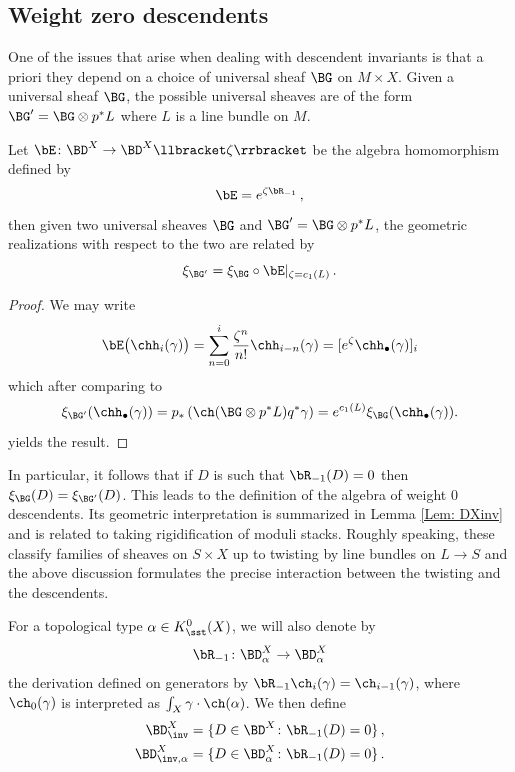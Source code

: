 \subsection{Weight zero descendents}
\label{sec: invariantdescendents}



One of the issues that arise when dealing with descendent invariants is that a priori they depend on a choice of universal sheaf $\BG$ on $M\times X$. Given a universal sheaf $\BG$, the possible universal sheaves are of the form
$\BG'=\BG\otimes p^\ast L$ where $L$ is a line bundle on $M$.
\begin{lemma}
\notready
\label{lem: changeuniversalsheaf}
Let $\bE\colon \BD^X\to \BD^X\llbracket\zeta\rrbracket$ be the algebra homomorphism defined by
$$
\bE = e^{\zeta \bR_{-1}}\,,
$$
then given two universal sheaves $\BG$ and $\BG'=\BG\otimes p^\ast L$, the geometric realizations with respect to the two are related by
\[\xi_{\BG'}=\xi_{\BG}\circ \bE|_{\zeta = c_1(L)} \,.\]
\end{lemma}
\begin{proof}
We may write
\[\bE\big(\chh_i(\gamma)\big) =\sum_{n=0}^i \frac{\zeta^n}{n!}\chh_{i-n}(\gamma)= [e^\zeta \chh_\bullet(\gamma)]_i\]
which after comparing to
\[\xi_{\BG'}(\chh_\bullet(\gamma))=p_\ast\left(\ch(\BG \otimes p^\ast L)q^\ast \gamma\right)=e^{c_1(L)}\xi_{\BG}(\chh_\bullet(\gamma)).\qedhere\]
yields the result.
\end{proof}
In particular, it follows that if $D$ is such that $\bR_{-1}(D)=0$ then $\xi_\BG(D)=\xi_{\BG'}(D)$. This leads to the definition of the algebra of weight 0 descendents. Its geometric interpretation is summarized in Lemma \ref{Lem: DXinv} and is related to taking rigidification of moduli stacks. Roughly speaking, these classify families of sheaves on $S\times X$
up to twisting by line bundles on $L\to S$ and the above discussion formulates the precise interaction between the twisting and the descendents.



\begin{definition}
\notready\label{def: invariantdescendents}
For a topological type $\alpha\in K_\sst^0(X)$, we will also denote by
\[\bR_{-1}\colon \BD^X_{ \alpha}\to \BD^X_{ \alpha}\] the derivation defined on generators by
$\bR_{-1}\ch_i(\gamma)=\ch_{i-1}(\gamma)$,
where $\ch_0(\gamma)$ is interpreted as $\int_X \gamma\cdot \ch(\alpha)$.
We then define
\begin{align*}\BD^X_{\inv}&=\{D\in \BD^X\colon \bR_{-1}(D)=0\}\,,\\
\BD^X_{\inv, \alpha}&=\{D\in \BD^X_{\alpha}\colon \bR_{-1}(D)=0\}\,.
\end{align*}
\end{definition}

